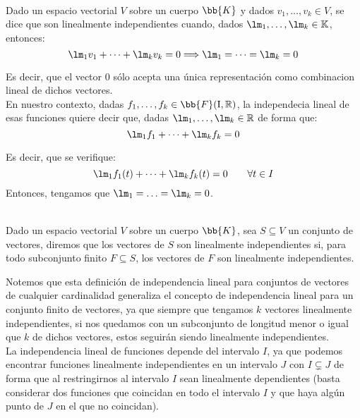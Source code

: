 \begin{definicion}\ \\
    Dado un espacio vectorial $V$ sobre un cuerpo $\bb{K}$ y dados $v_1,\ldots,v_k \in V$, se dice que son linealmente independientes cuando, dados $\lm_1,\ldots,\lm_k\in \mathbb{K}$, entonces:
    \begin{equation*}
        \lm_1v_1 + \cdots + \lm_k v_k = 0 \Longrightarrow \lm_1 = \cdots = \lm_k = 0
    \end{equation*}
\end{definicion}
Es decir, que el vector 0 sólo acepta una única representación como combinacion lineal de dichos vectores.\\

En nuestro contexto, dadas $f_1,\ldots,f_k\in \bb{F}(\text{I},\mathbb{R})$, la independecia lineal de esas funciones quiere decir que, dadas $\lm_1,\ldots,\lm_k\in \mathbb{R}$ de forma que:
\begin{equation*}
    \lm_1f_1 + \cdots + \lm_k f_k = 0 
\end{equation*}

Es decir, que se verifique:
\begin{equation*}
    \lm_1f_1(t) + \cdots + \lm_k f_k(t) = 0 \qquad \forall t\in I 
\end{equation*}
Entonces, tengamos que $\lm_1=\ldots=\lm_k = 0$.

\begin{definicion}\ \\
    Dado un espacio vectorial $V$ sobre un cuerpo $\bb{K}$, sea $S\subseteq V$ un conjunto de vectores, diremos que los vectores de $S$ son linealmente independientes si, para todo subconjunto finito $F\subseteq S$, los vectores de $F$ son linealmente independientes.
\end{definicion}
Notemos que esta definición de independencia lineal para conjuntos de vectores de cualquier cardinalidad generaliza el concepto de independencia lineal para un conjunto finito de vectores, ya que siempre que tengamos $k$ vectores linealmente independientes, si nos quedamos con un subconjunto de longitud menor o igual que $k$ de dichos vectores, estos seguirán siendo linealmente independientes.\\

La independencia lineal de funciones depende del intervalo $I$, ya que podemos encontrar funciones linealmente independientes en un intervalo $J$ con $I\subsetneq J$ de forma que al restringirnos al intervalo $I$ sean linealmente dependientes (basta considerar dos funciones que coincidan en todo el intervalo $I$ y que haya algún punto de $J$ en el que no coincidan).\\

